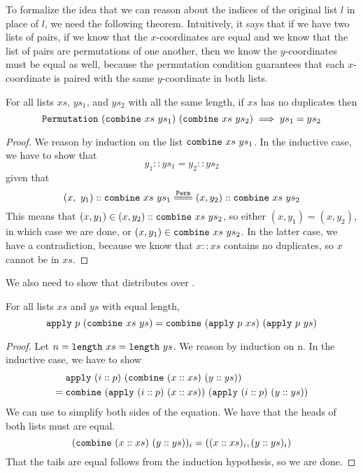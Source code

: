 \documentclass[sigplan,10pt,anonymous,review]{thesis}
\begin{document}
To formalize the idea that we can reason about the indices of the
original list $l$ in place of $l$, we need the following theorem.
Intuitively, it says that if we have two lists of pairs, if we know
that the $x$-coordinates are equal and we know that the list of pairs
are permutations of one another, then we know the $y$-coordinates must
be equal as well, because the permutation condition guarantees that
each $x$-coordinate is paired with the same $y$-coordinate in both
lists.
\begin{theorem}
  \label{thm:Permutation_combine_eq}
  For all lists $xs$, $ys_1$, and $ys_2$ with all the same length,
  if $xs$ has no duplicates then
  \begin{equation*}
    \texttt{\textup{Permutation}}~(\texttt{\textup{combine}}~xs~ys_1)~(\texttt{\textup{combine}}~xs~ys_2) \implies ys_1 = ys_2
  \end{equation*}
\end{theorem}
\begin{proof}
  We reason by induction on the list $\texttt{\textup{combine}}~xs~ys_1$. In the
  inductive case, we have to show that
  \begin{equation*}
    y_1 :: ys_1 = y_2 :: ys_2
  \end{equation*}
  given that
  \begin{equation*}
    (x,~y_1) :: \var{combine}~xs~ys_1 \eqperm (x, y_2) :: \var{combine}~xs~ys_2
  \end{equation*}
  This means that $(x, y_1) \in (x, y_2) :: \texttt{\textup{combine}}~xs~ys_2$, so
  either $(x, y_1) = (x, y_2)$, in which case we are done, or $(x,
  y_1) \in \texttt{\textup{combine}}~xs~ys_2$. In the latter case, we have a
  contradiction, because we know that $x :: xs$ contains no
  duplicates, so $x$ cannot be in $xs$.
\end{proof}

We also need to show that  distributes over .
\begin{theorem}
  For all lists $xs$ and $ys$ with equal length,
  \begin{equation*}
    \texttt{\textup{apply}}~p~(\texttt{\textup{combine}}~xs~ys) =
    \texttt{\textup{combine}}~(\texttt{\textup{apply}}~p~xs)~(\texttt{\textup{apply}}~p~ys)
  \end{equation*}
\end{theorem}
\begin{proof}
  Let $n = \texttt{\textup{length}}~xs = \texttt{\textup{length}}~ys$. We reason by induction
  on n. In the inductive case, we have to show
  \begin{align*}
    & \texttt{\textup{apply}}~(i::p)~(\texttt{\textup{combine}}~(x::xs)~(y::ys)) \\
    ={}& \texttt{\textup{combine}}~(\texttt{\textup{apply}}~(i::p)~(x::xs))~(\texttt{\textup{apply}}~(i::p)~(y::ys))
  \end{align*}
  We can use  to simplify both sides of the
  equation. We have that the heads of both lists must are equal.
  \begin{equation*}
    (\texttt{\textup{combine}}~(x::xs)~(y::ys))_i = ((x::xs)_i, (y::ys)_i)
  \end{equation*}
  That the tails are equal follows from the induction hypothesis, so
  we are done.
\end{proof}
\end{document}
